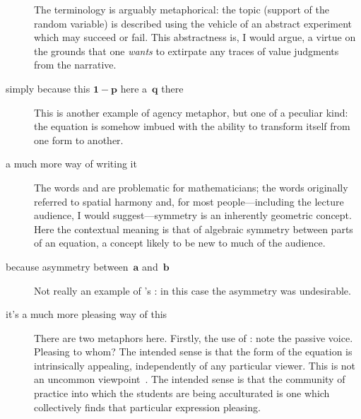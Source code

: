 \begin{description}
{  The terminology is arguably metaphorical: the topic (support of the
  random variable) is described using the vehicle of an abstract
  experiment which may succeed or fail.  This abstractness is, I would
  argue, a virtue on the grounds that one \emph{wants} to extirpate
  any traces of value judgments from the narrative.}

\item[simply because this $\mathbf{1-p}$ here \metaphor{turns into}
  a~$\mathbf{q}$ there]{This is another example of agency metaphor,
  but one of a peculiar kind: the equation is somehow imbued with the
  ability to transform itself from one form to another.}

\item[a much more \metaphor{symmetric} way of writing it]{The words
   and  are problematic for
  mathematicians; the words originally referred to spatial harmony
  and, for most people---including the lecture audience, I would
  suggest---symmetry is an inherently geometric concept.  Here the
  contextual meaning is that of algebraic symmetry between parts of an
  equation, a concept likely to be new to much of the audience.}
\item[because \metaphor{we have} asymmetry between~$\mathbf{a}$
  and~$\mathbf{b}$]{Not really an example of \citeauthor{pimm1984}'s
  : in this case the asymmetry was undesirable.}
\item[it's a much more pleasing way of \metaphor{handling} this]{There
  are two metaphors here.  Firstly, the use of : note
  the passive voice.  Pleasing to whom?  The intended sense is that
  the form of the equation is intrinsically appealing, independently
  of any particular viewer.  This is not an uncommon
  viewpoint~\citep{rota2011}.  The intended sense is that the
  community of practice into which the students are being acculturated
  is one which collectively finds that particular expression pleasing.

}
\end{description}
